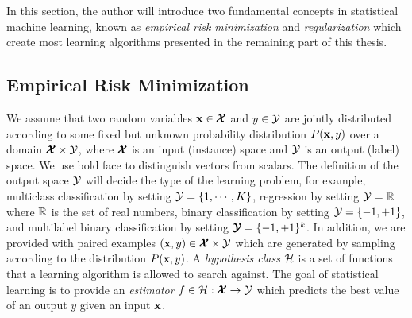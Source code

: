 In this section, the author will introduce two fundamental concepts in statistical machine learning, known as \textit{empirical risk minimization} \citep{Vapnik92principles} and \textit{regularization} \citep{Evgeniou99a} which create most learning algorithms presented in the remaining part of this thesis.

\subsection{Empirical Risk Minimization}\label{sc_erm}

We assume that two random variables $\mathbf {x}\in\pmb {\mathcal{X}}$ and $y\in\mathcal{Y}$ are jointly distributed according to some fixed but unknown probability distribution $P(\mathbf {x},y)$ over a domain $\pmb {\mathcal{X}}\times\mathcal{Y}$, where $\pmb {\mathcal{X}}$ is an input (instance) space and $\mathcal{Y}$ is an output (label) space.
We use bold face to distinguish vectors from scalars. 
The definition of the output space $\mathcal{Y}$ will decide the type of the learning problem,
for example, 
multiclass classification by setting $\mathcal{Y}=\{1,\cdots,K\}$,
regression by setting $\mathcal{Y}=\mathbb{R}$ where $\mathbb{R}$ is the set of real numbers,
binary classification by setting $\mathcal{Y}=\{-1,+1\}$, 
and multilabel binary classification by setting $\pmb {\mathcal{Y}} = \{-1,+1\}^k$.
In addition, we are provided with paired examples $(\mathbf {x},y)\in\pmb {\mathcal{X}}\times\mathcal{Y}$ which are generated by sampling according to the distribution $P(\mathbf {x},y)$.
A \textit{hypothesis class} $\mathcal{H}$ is a set of functions that a learning algorithm is allowed to search against.
The goal of statistical learning is to provide an \textit{estimator} $f\in\mathcal{H}:\pmb {\mathcal{X}}\rightarrow\mathcal{Y}$ which predicts the best value of an output $y$ given an input $\mathbf {x}$.

